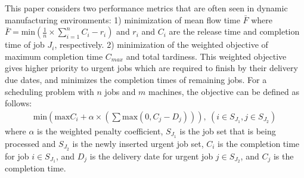 This paper considers two performance metrics that are often seen in dynamic manufacturing environments: 1) minimization of mean flow time $\bar{F}$ where $\bar{F} = \text{min}(\frac{1}{n} \times \sum_{i = 1}^n C_i - r_i)$ and $r_i$ and $C_i$ are the release time and completion time of job $J_i$, respectively.
2) minimization of the weighted objective of maximum completion time $C_{max}$ and total tardiness. This weighted objective gives higher priority to urgent jobs which are required to finish by their delivery due dates, and minimizes the completion times of remaining jobs.
For a scheduling problem with $n$ jobs and $m$ machines, the objective can be defined as follows:
\begin{align}
	\text{min}(\text{max}C_i + \alpha \times (\sum\text{max}(0, C_j - D_j))), \ (i \in S_{J_1}, j \in S_{J_2})
\end{align}
where $\alpha$ is the weighted penalty coefficient, $S_{J_1}$ is the job set that is being processed and $S_{J_2}$ is the newly inserted urgent job set, $C_i$ is the completion time for job $i \in S_{J_1}$, and $D_j$ is the delivery date for urgent job $j \in S_{J_2}$, and $C_j$ is the completion time.